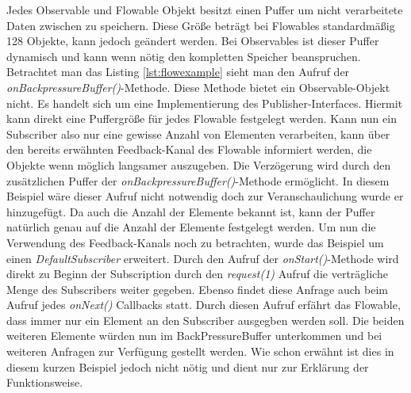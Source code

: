 
Jedes Observable und Flowable Objekt besitzt einen Puffer um nicht verarbeitete Daten zwischen zu speichern. Diese Größe beträgt bei Flowables standardmäßig 128 Objekte, kann jedoch geändert werden. Bei Observables ist dieser Puffer dynamisch und kann wenn nötig den kompletten Speicher beanspruchen. Betrachtet man das Listing \ref{lst:flowexample} sieht man den Aufruf der \textit{onBackpressureBuffer()}-Methode. Diese Methode bietet ein Observable-Objekt nicht. Es handelt sich um eine Implementierung des Publisher-Interfaces. Hiermit kann direkt eine Puffergröße für jedes Flowable festgelegt werden. Kann nun ein Subscriber also nur eine gewisse Anzahl von Elementen verarbeiten, kann über den bereits erwähnten Feedback-Kanal des Flowable informiert werden, die Objekte wenn möglich langsamer auszugeben. Die Verzögerung wird durch den zusätzlichen Puffer der \textit{onBackpressureBuffer()}-Methode ermöglicht. In diesem Beispiel wäre dieser Aufruf nicht notwendig doch zur Veranschaulichung wurde er hinzugefügt. Da auch die Anzahl der Elemente bekannt ist, kann der Puffer natürlich genau auf die Anzahl der Elemente festgelegt werden.
Um nun die Verwendung des Feedback-Kanals noch zu betrachten, wurde das Beispiel um einen \textit{DefaultSubscriber} erweitert.
Durch den Aufruf der \textit{onStart()}-Methode wird direkt zu Beginn der Subscription durch den \textit{request(1)} Aufruf die verträgliche Menge des Subscribers weiter gegeben. Ebenso findet diese Anfrage auch beim Aufruf jedes \textit{onNext()} Callbacks statt. Durch diesen Aufruf erfährt das Flowable, dass immer nur ein Element an den Subscriber ausgegben werden soll. Die beiden weiteren Elemente würden nun im BackPressureBuffer unterkommen und bei weiteren Anfragen zur Verfügung gestellt werden. Wie schon erwähnt ist dies in diesem kurzen Beispiel jedoch nicht nötig und dient nur zur Erklärung der Funktionsweise.
